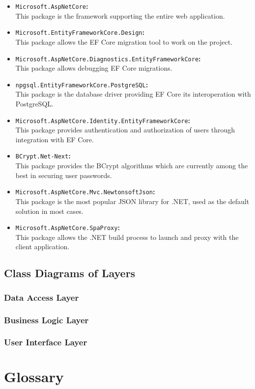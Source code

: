\documentclass[a4paper, 12pt, titlepage]{article}
\begin{document}
  \begin{itemize}
    \item \texttt{Microsoft.AspNetCore}\textbf{:}\\
      This package is the framework supporting the entire web application.
    \item \texttt{Microsoft.EntityFrameworkCore.Design}\textbf{:}\\
      This package allows the EF Core migration tool to work on the project.
    \item \texttt{Microsoft.AspNetCore.Diagnostics.EntityFrameworkCore}\textbf{:}\\
      This package allows debugging EF Core migrations.
    \item \texttt{npgsql.EntityFrameworkCore.PostgreSQL}\textbf{:}\\
      This package is the database driver providing EF Core its interoperation with PostgreSQL.
    \item \texttt{Microsoft.AspNetCore.Identity.EntityFrameworkCore}\textbf{:}\\
      This package provides authentication and authorization of users through integration with EF Core.
    \item \texttt{BCrypt.Net-Next}\textbf{:}\\
      This package provides the BCrypt algorithms which are currently among the best in securing user passwords.
    \item \texttt{Microsoft.AspNetCore.Mvc.NewtonsoftJson}\textbf{:}\\
      This package is the most popular JSON library for .NET, used as the default solution in most cases.
    \item \texttt{Microsoft.AspNetCore.SpaProxy}\textbf{:}\\
      This package allows the .NET build process to launch and proxy with the client application.
  \end{itemize}

  \subsection{Class Diagrams of Layers}

  \subsubsection{Data Access Layer}

  \subsubsection{Business Logic Layer}

  \subsubsection{User Interface Layer}

  \section{Glossary}
\end{document}
